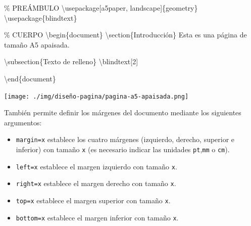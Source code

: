 \documentclass[
  letterpaper,
  DIV=11,
  numbers=noendperiod]{scrreport}
\newenvironment{Shaded}{\begin{snugshade}}{\end{snugshade}}
\newcommand{\BuiltInTok}[1]{\textcolor[rgb]{0.00,0.23,0.31}{#1}}
\newcommand{\CommentTok}[1]{\textcolor[rgb]{0.37,0.37,0.37}{#1}}
\newcommand{\ExtensionTok}[1]{\textcolor[rgb]{0.00,0.23,0.31}{#1}}
\newcommand{\FunctionTok}[1]{\textcolor[rgb]{0.28,0.35,0.67}{#1}}
\newcommand{\KeywordTok}[1]{\textcolor[rgb]{0.00,0.23,0.31}{#1}}
\newcommand{\NormalTok}[1]{\textcolor[rgb]{0.00,0.23,0.31}{#1}}
\providecommand{\tightlist}{%
  \setlength{\itemsep}{0pt}\setlength{\parskip}{0pt}}\usepackage{longtable,booktabs,array}
\begin{document}
\begin{Shaded}
\begin{Highlighting}[]
\CommentTok{\% PREÁMBULO}
\BuiltInTok{\textbackslash{}usepackage}\NormalTok{[a5paper, landscape]\{}\ExtensionTok{geometry}\NormalTok{\}}
\BuiltInTok{\textbackslash{}usepackage}\NormalTok{\{}\ExtensionTok{blindtext}\NormalTok{\}}

\CommentTok{\% CUERPO}
\KeywordTok{\textbackslash{}begin}\NormalTok{\{}\ExtensionTok{document}\NormalTok{\}}
\KeywordTok{\textbackslash{}section}\NormalTok{\{Introducción\}}
\NormalTok{Esta es una página de tamaño A5 apaisada.}

\KeywordTok{\textbackslash{}subsection}\NormalTok{\{Texto de relleno\}}
\FunctionTok{\textbackslash{}blindtext}\NormalTok{[2]}

\KeywordTok{\textbackslash{}end}\NormalTok{\{}\ExtensionTok{document}\NormalTok{\}}
\end{Highlighting}
\end{Shaded}

\begin{tcolorbox}[enhanced jigsaw, arc=.35mm, toprule=.15mm, opacitybacktitle=0.6, colback=white, coltitle=black, colbacktitle=quarto-callout-note-color!10!white, breakable, colframe=quarto-callout-note-color-frame, left=2mm, opacityback=0, bottomtitle=1mm, toptitle=1mm, titlerule=0mm, title={Salida}, bottomrule=.15mm, leftrule=.75mm, rightrule=.15mm]
\texttt{[image: ./img/diseño-pagina/pagina-a5-apaisada.png]}
\end{tcolorbox}

También permite definir los márgenes del documento mediante los
siguientes argumentos:

\begin{itemize}
\tightlist
\item
  \texttt{margin=x} establece los cuatro márgenes (izquierdo, derecho,
  superior e inferior) con tamaño \texttt{x} (es necesario indicar las
  unidades \texttt{pt},\texttt{mm} o \texttt{cm}).
\item
  \texttt{left=x} establece el margen izquierdo con tamaño \texttt{x}.
\item
  \texttt{right=x} establece el margen derecho con tamaño \texttt{x}.
\item
  \texttt{top=x} establece el margen superior con tamaño \texttt{x}.
\item
  \texttt{bottom=x} establece el margen inferior con tamaño \texttt{x}.
\end{itemize}
\end{document}

